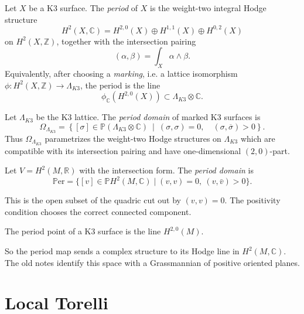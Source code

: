 \begin{definition}
\label{definition-period-k3-surface}
Let $X$ be a K3 surface.
The {\it period} of $X$ is the
weight-two integral Hodge structure
$$
H^2(X,\mathbb{C})
=
H^{2,0}(X)\oplus H^{1,1}(X)
\oplus H^{0,2}(X)
$$
on $H^2(X,\mathbb{Z})$, together with
the intersection pairing
$$
(\alpha,\beta)=\int_X\alpha\wedge\beta.
$$
Equivalently, after choosing a {\it
marking}, i.e. a lattice isomorphism
$\phi:H^2(X,\mathbb{Z})\to\Lambda_{K3}$,
the period is the line
$$
\phi_{\mathbb{C}}(H^{2,0}(X))
\subset\Lambda_{K3}\otimes\mathbb{C}.
$$
\end{definition}

\begin{definition}
\label{definition-period-domain-k3-surfaces}
Let $\Lambda_{K3}$ be the K3 lattice.
The {\it period domain} of marked K3
surfaces is
$$
\Omega_{\Lambda_{K3}}
=
\left\{
[\sigma]\in
\mathbb{P}(\Lambda_{K3}\otimes\mathbb{C})
\ \middle|\
(\sigma,\sigma)=0,\quad
(\sigma,\overline{\sigma})>0
\right\}.
$$
Thus $\Omega_{\Lambda_{K3}}$ parametrizes
the weight-two Hodge structures on
$\Lambda_{K3}$ which are compatible with
its intersection pairing and have
one-dimensional $(2,0)$-part.
\end{definition}

\begin{definition}[Misha]
Let $V=H^2(M,\mathbb{R})$ with the
intersection form.
The \textit{period domain} is
\[
\mathbb{P}\mathrm{er}=
\{[v]\in \mathbb{P}H^2(M,\mathbb{C})
\mid (v,v)=0,\ (v,\bar{v})>0\}.
\]
\end{definition}

\begin{remark}
This is the open subset of the
quadric cut out by $(v,v)=0$.
The positivity condition chooses
the correct connected component.
\end{remark}

\begin{proposition}[Misha]
The period point of a K3 surface
is the line $H^{2,0}(M)$.
\end{proposition}

\begin{remark}
So the period map sends a complex
structure to its Hodge line in
$H^2(M,\mathbb{C})$.
The old notes identify this
space with a Grassmannian of
positive oriented planes.
\end{remark}

\section{Local Torelli}
\label{section-local-torelli}

